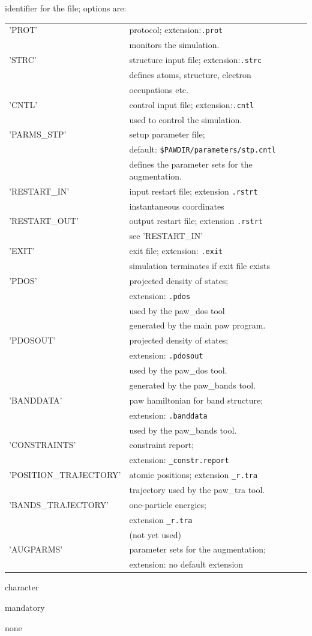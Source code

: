 \documentclass[final,12pt,makeidx,DIV=calc]{article}
\newcommand{\key}[1]{\hfill\break \makebox[1.5in][l]{\bf #1}\hfill\break}
\newcommand{\vdescr}[1]{\makebox[1in][l]{}\parbox[t]{110mm}{#1}\hfill\break}
\newcommand{\vformat}[1]{
\makebox[1in][l]{}\parbox[t]{110mm}{\makebox[1in][l]{Type:}\parbox[t]{2.7in}{#1}}
\hfill\break}
\newcommand{\vrules}[1]{
\makebox[1in][l]{}\parbox[t]{110mm}{\makebox[1in][l]{Rules:}\parbox[t]{2.7in}{#1}}
\hfill\break}
\newcommand{\vdefault}[1]{
\makebox[1in][l]{}\parbox[t]{110mm}
{\makebox[1in][l]{Default:}\parbox[t]{2.7in}{#1}}
\hfill\break}
\newcommand{\mbax}[1]{#1}
\begin{document}
\newpage
\mbax{\key{ID}
\vdescr{identifier for the file; options are:\hfill\break 
\noindent
\begin{tabular}{|l|l|}
\hline
'PROT'& protocol; extension:{\tt .prot}\\
&monitors the simulation.\\
\hline
'STRC'& structure input file; extension:{\tt .strc}\\
& defines atoms, structure, electron \\
&occupations etc.\\
\hline
'CNTL'& control input file; extension:{\tt .cntl}\\
&used to control the simulation.\\
\hline
'PARMS\_STP'& setup parameter file; \\
&default: {\tt \$PAWDIR/parameters/stp.cntl}\\
&defines the parameter sets for the augmentation.\\
\hline
'RESTART\_IN'& input restart file; extension {\tt .rstrt}\\
&instantaneous coordinates\\
\hline
'RESTART\_OUT'& output restart file; extension {\tt .rstrt}\\
&see 'RESTART\_IN'\\
\hline
'EXIT'& exit file; extension: {\tt .exit}\\
& simulation terminates if exit file exists\\
\hline
'PDOS'& projected density of states;\\
& extension: {\tt .pdos}\\
& used by the paw\_dos tool\\
& generated by the main paw program.\\
\hline
'PDOSOUT'& projected density of states;\\
& extension: {\tt .pdosout}\\
& used by the paw\_dos tool.\\
& generated by the paw\_bands tool.\\
\hline
'BANDDATA'& paw hamiltonian for band structure;\\
& extension: {\tt .banddata}\\
& used by the paw\_bands tool.\\
\hline
'CONSTRAINTS'& constraint report;\\
& extension: {\tt \_constr.report}\\
\hline
'POSITION\_TRAJECTORY'& atomic positions; 
extension {\tt \_r.tra}\\
&trajectory used by the paw\_tra tool.\\
\hline
'BANDS\_TRAJECTORY'& one-particle energies;\\
&extension {\tt \_r.tra}\\
&(not yet used)\\
\hline
'AUGPARMS'& parameter sets for the augmentation;\\
&extension: no default extension\\
\hline
\end{tabular}
}
\vformat{character} 
\vrules{mandatory}
\vdefault{none}}
\end{document}
